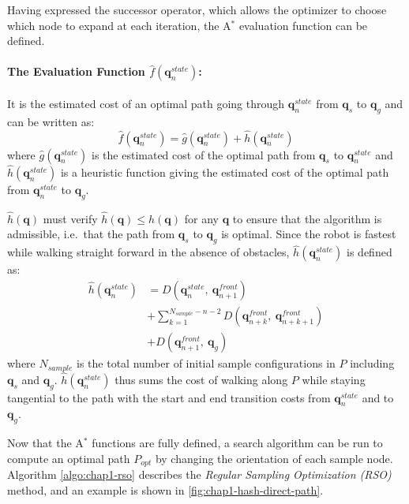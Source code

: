 Having expressed the successor operator, which allows the optimizer to
choose which node to expand at each iteration, the A$^{*}$ evaluation
function can be defined.

\paragraph{The Evaluation Function $\hat{f}(\mathbf{q}_n^{state})$:}
It is the estimated cost of an optimal path going through
$\mathbf{q}_n^{state}$ from $\mathbf{q}_s$ to $\mathbf{q}_g$ and can be written as:
\begin{equation}
  \hat{f}(\mathbf{q}_n^{state}) = \hat{g}(\mathbf{q}_n^{state}) +
  \hat{h}(\mathbf{q}_n^{state})
\end{equation}
\noindent where $\hat{g}(\mathbf{q}_n^{state})$ is the estimated cost of the
optimal path from $\mathbf{q}_s$ to $\mathbf{q}_n^{state}$ and
$\hat{h}(\mathbf{q}_n^{state})$ is a heuristic function giving the
estimated cost of the optimal path from $\mathbf{q}_n^{state}$ to
$\mathbf{q}_g$.

$\hat{h}(\mathbf{q})$ must verify $\hat{h}(\mathbf{q}) \leq
h(\mathbf{q})$ for any $\mathbf{q}$ to ensure that the algorithm is
admissible, i.e.\ that the path from $\mathbf{q}_s$ to $\mathbf{q}_g$
is optimal. Since the robot is fastest while walking straight forward
in the absence of obstacles, $\hat{h}(\mathbf{q}_n^{state})$ is
defined as:
\begin{equation}
  \begin{split}
  \hat{h}(\mathbf{q}_n^{state}) &= D(\mathbf{q}_n^{state},~\mathbf{q}_{n+1}^{front}) \\
  &+ \sum_{k=1}^{N_{sample}-n-2} D(\mathbf{q}_{n+k}^{front},~\mathbf{q}_{n+k+1}^{front}) \\
  &+ D(\mathbf{q}_{n+1}^{front},~\mathbf{q}_g)
  \end{split}
\end{equation}
\noindent where $N_{sample}$ is the total number of initial sample
configurations in $P$ including $\mathbf{q}_s$ and
$\mathbf{q}_g$. $\hat{h}(\mathbf{q}_n^{state})$ thus sums the cost of
walking along $P$ while staying tangential to the path with the start
and end transition costs from $\mathbf{q}_n^{state}$ and to
$\mathbf{q}_g$.

Now that the A$^{*}$ functions are fully defined, a search algorithm
can be run to compute an optimal path $P_{opt}$ by changing the
orientation of each sample node. Algorithm \ref{algo:chap1-rso}
describes the \emph{Regular Sampling Optimization (RSO)} method, and
an example is shown in \autoref{fig:chap1-hash-direct-path}.

